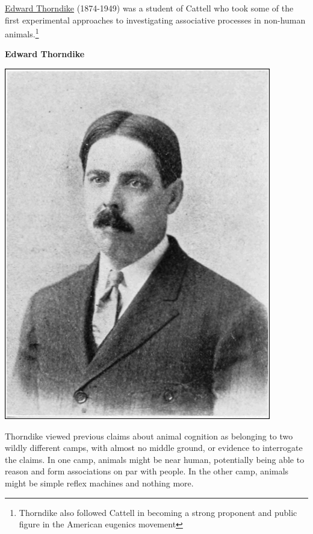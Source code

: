 \documentclass[
  oneside,
  12pt]{crumpbook}
\newenvironment{floatrightbox25}{%
  \wrapfigure{R}{.25\textwidth}%
  }{%
  \endwrapfigure}
\begin{document}
\href{https://en.wikipedia.org/wiki/Edward_Thorndike}{Edward Thorndike} (1874-1949) was a student of Cattell who took some of the first experimental approaches to investigating associative processes in non-human animals.\footnote{Thorndike also followed Cattell in becoming a strong proponent and public figure in the American eugenics movement}

\begin{floatrightbox25}
\textbf{Edward Thorndike}

\includegraphics[width=1\linewidth]{imgs/Edward_thorndike}

\end{floatrightbox25}

Thorndike viewed previous claims about animal cognition as belonging to two wildly different camps, with almost no middle ground, or evidence to interrogate the claims. In one camp, animals might be near human, potentially being able to reason and form associations on par with people. In the other camp, animals might be simple reflex machines and nothing more.
\end{document}
